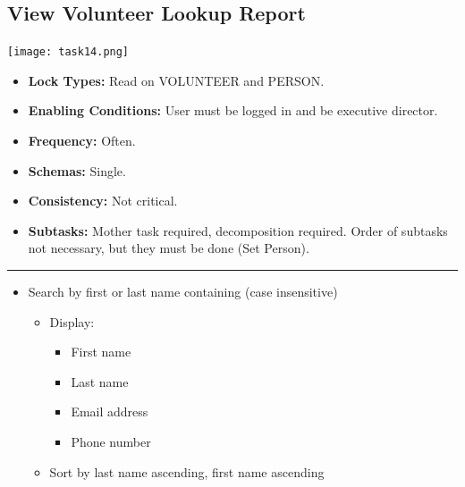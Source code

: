 \documentclass{article}
\begin{document}
\subsection{View Volunteer Lookup Report}
\begin{center}
    \texttt{[image: task14.png]}
\end{center}
\begin{itemize}
    \item \textbf{Lock Types:} Read on VOLUNTEER and PERSON.
    \item \textbf{Enabling Conditions:} User must be logged in and be executive director.
    \item \textbf{Frequency:} Often.
    \item \textbf{Schemas:} Single.
    \item \textbf{Consistency:} Not critical.
    \item \textbf{Subtasks:} Mother task required, decomposition required. Order of subtasks not necessary, but they must be done (Set Person).
\end{itemize}
\noindent\rule{8cm}{0.4pt}
\begin{itemize}
\item Search by first or last name containing (case insensitive)
\begin{itemize}
    \item Display:
    \begin{itemize}
        \item First name
        \item Last name
        \item Email address
        \item Phone number
    \end{itemize}
    \item Sort by last name ascending, first name ascending
\end{itemize}        
\end{itemize}    
\end{document}
